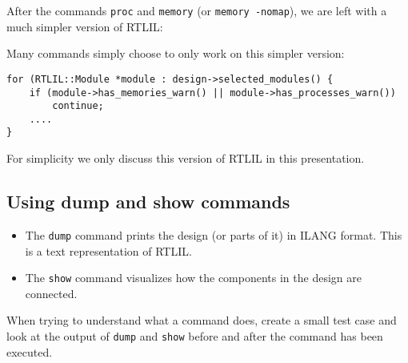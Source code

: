 \begin{frame}[fragile]{\subsecname}
After the commands {\tt proc} and {\tt memory} (or {\tt memory -nomap}), we are
left with a much simpler version of RTLIL:

\begin{center}
\end{center}

\bigskip
Many commands simply choose to only work on this simpler version:
\begin{lstlisting}[xleftmargin=0.5cm, basicstyle=\ttfamily\fontsize{8pt}{10pt}\selectfont]
for (RTLIL::Module *module : design->selected_modules() {
    if (module->has_memories_warn() || module->has_processes_warn())
        continue;
    ....
}
\end{lstlisting}

For simplicity we only discuss this version of RTLIL in this presentation.
\end{frame}


\subsection{Using dump and show commands}

\begin{frame}{\subsecname}
\begin{itemize}
\item The {\tt dump} command prints the design (or parts of it) in ILANG format. This is
a text representation of RTLIL.

\bigskip
\item The {\tt show} command visualizes how the components in the design are connected.
\end{itemize}

\bigskip
When trying to understand what a command does, create a small test case and
look at the output of {\tt dump} and {\tt show} before and after the command
has been executed.
\end{frame}

